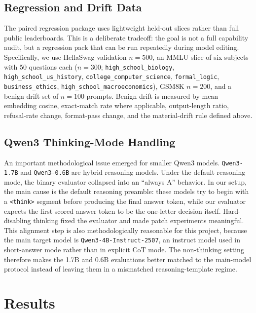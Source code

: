 \documentclass{article}
\begin{document}
\subsection{Regression and Drift Data}
The paired regression package uses lightweight held-out slices rather than full public leaderboards. This is a deliberate tradeoff: the goal is not a full capability audit, but a regression pack that can be run repeatedly during model editing. Specifically, we use HellaSwag validation $n=500$, an MMLU slice of six subjects with 50 questions each ($n=300$; \texttt{high\_school\_biology}, \texttt{high\_school\_us\_history}, \texttt{college\_computer\_science}, \texttt{formal\_logic}, \texttt{business\_ethics}, \texttt{high\_school\_macroeconomics}), GSM8K $n=200$, and a benign drift set of $n=100$ prompts. Benign drift is measured by mean embedding cosine, exact-match rate where applicable, output-length ratio, refusal-rate change, format-pass change, and the material-drift rule defined above.

\subsection{Qwen3 Thinking-Mode Handling}
An important methodological issue emerged for smaller Qwen3 models. \texttt{Qwen3-1.7B} and \texttt{Qwen3-0.6B} are hybrid reasoning models. Under the default reasoning mode, the binary evaluator collapsed into an ``always A'' behavior. In our setup, the main cause is the default reasoning preamble: these models try to begin with a \texttt{<think>} segment before producing the final answer token, while our evaluator expects the first scored answer token to be the one-letter decision itself. Hard-disabling thinking fixed the evaluator and made patch experiments meaningful. This alignment step is also methodologically reasonable for this project, because the main target model is \texttt{Qwen3-4B-Instruct-2507}, an instruct model used in short-answer mode rather than in explicit CoT mode. The non-thinking setting therefore makes the 1.7B and 0.6B evaluations better matched to the main-model protocol instead of leaving them in a mismatched reasoning-template regime.

\section{Results}
\end{document}
